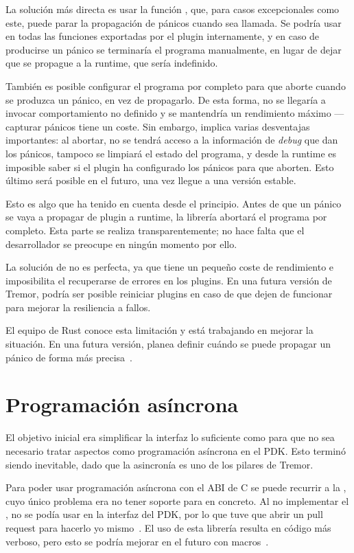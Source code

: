 La solución más directa es usar la función , que,
para casos excepcionales como este, puede parar la propagación de pánicos cuando
sea llamada. Se podría usar en todas las funciones exportadas por el plugin
internamente, y en caso de producirse un pánico se terminaría el programa
manualmente, en lugar de dejar que se propague a la runtime, que sería
indefinido.

También es posible configurar el programa por completo para que aborte cuando se
produzca un pánico, en vez de propagarlo. De esta forma, no se llegaría a
invocar comportamiento no definido y se mantendría un rendimiento máximo ---
capturar pánicos tiene un coste. Sin embargo, implica varias desventajas
importantes: al abortar, no se tendrá acceso a la información de \emph{debug}
que dan los pánicos, tampoco se limpiará el estado del programa, y desde la
runtime es imposible saber si el plugin ha configurado los pánicos para que
aborten. Esto último será posible en el futuro, una vez
 llegue a una versión estable.

Esto es algo que \abistable ha tenido en cuenta desde el principio. Antes de que
un pánico se vaya a propagar de plugin a runtime, la librería abortará el
programa por completo. Esta parte se realiza transparentemente; no hace falta
que el desarrollador se preocupe en ningún momento por ello.

La solución de \abistable no es perfecta, ya que tiene un pequeño coste de
rendimiento e imposibilita el recuperarse de errores en los plugins. En una
futura versión de Tremor, podría ser posible reiniciar plugins en caso de que
dejen de funcionar para mejorar la resiliencia a fallos.

El equipo de Rust conoce esta limitación y está trabajando en mejorar la
situación. En una futura versión, planea definir cuándo se puede propagar un
pánico de forma más precisa~\cite{cunwind}.

\section{Programación asíncrona}

El objetivo inicial era simplificar la interfaz lo suficiente como para que no
sea necesario tratar aspectos como programación asíncrona en el PDK. Esto
terminó siendo inevitable, dado que la asincronía es uno de los pilares de
Tremor.

Para poder usar programación asíncrona con el ABI de C se puede recurrir a la
\crate {}, cuyo único problema era no tener soporte para
\abistable en concreto. Al no implementar el \trait {}, no se
podía usar en la interfaz del PDK, por lo que tuve que abrir un pull request
para hacerlo yo mismo~\cite{asyncfficontrib}. El uso de esta librería resulta en
código más verboso, pero esto se podría mejorar en el futuro con
macros~\cite{asyncffimacro}.

